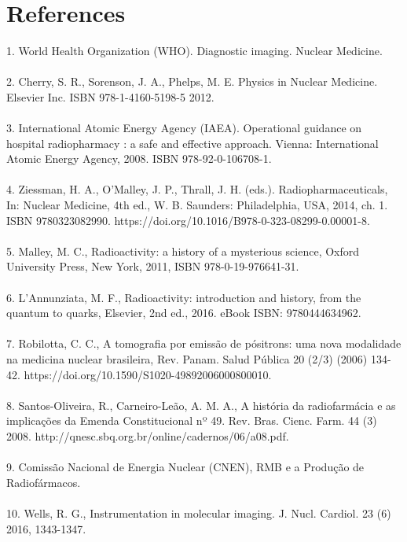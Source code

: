 \documentclass[12pt]{article}
\begin{document}
\section{References}
1.  World  Health  Organization  (WHO).  Diagnostic imaging.    Nuclear  Medicine.
\\
\\
2. Cherry, S. R., Sorenson, J. A., Phelps, M. E. Physics in Nuclear Medicine. Elsevier Inc. ISBN 978-1-4160-5198-5  2012.
\\
\\
3.  International  Atomic  Energy  Agency  (IAEA). Operational guidance on hospital radiopharmacy : a safe and effective  approach. Vienna:  International Atomic Energy  Agency,  2008.  ISBN  978-92-0-106708-1. 
\\
\\
4. Ziessman, H. A., O’Malley, J. P., Thrall, J. H. (eds.). Radiopharmaceuticals, In: Nuclear Medicine, 4th ed., W. B.  Saunders:  Philadelphia,  USA,  2014,  ch.  1.  ISBN 9780323082990.  https://doi.org/10.1016/B978-0-323-08299-0.00001-8. 
\\
\\
5.  Malley,  M.  C.,  Radioactivity:  a  history  of  a mysterious  science,  Oxford  University  Press,  New York, 2011, ISBN 978-0-19-976641-31. 
\\
\\
6. L’Annunziata, M. F., Radioactivity: introduction and history, from the quantum to quarks, Elsevier, 2nd ed., 2016. eBook ISBN: 9780444634962. 
\\
\\
7.  Robilotta,  C.  C.,  A  tomografia  por  emissão  de pósitrons: uma  nova  modalidade na  medicina  nuclear brasileira, Rev. Panam. Salud Pública 20 (2/3) (2006) 134-42.  https://doi.org/10.1590/S1020-49892006000800010.
\\
\\
8.  Santos-Oliveira,  R.,  Carneiro-Leão,  A.  M.  A.,  A história da radiofarmácia e as implicações da Emenda Constitucional  nº  49. Rev. Bras. Cienc. Farm.  44 (3) 2008. http://qnesc.sbq.org.br/online/cadernos/06/a08.pdf.
\\
\\
9.  Comissão Nacional  de Energia  Nuclear  (CNEN), RMB  e  a  Produção  de  Radiofármacos.
\\
\\
10.  Wells,  R.  G.,  Instrumentation  in  molecular imaging.  J.  Nucl.  Cardiol.  23  (6)  2016,  1343-1347. 
\\
\end{document}
